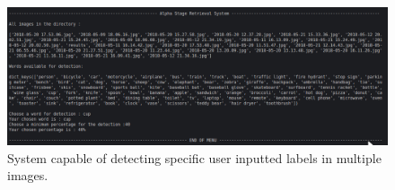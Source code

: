 \begin{figure}[H]
  \centering
  \includegraphics[width = \textwidth]{Sections/4InitialWork/4_images_random/alpha.png}
  \caption{System capable of detecting specific user inputted labels in multiple images. }
  \label{fig:yolov3} 
\end{figure}





